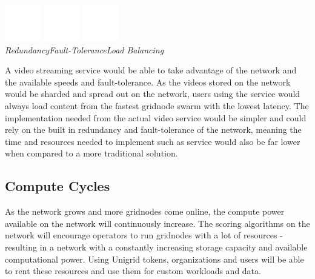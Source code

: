 \documentclass{article}
\begin{document}
\begin{center}
\vspace{0.1cm}
\includegraphics[width=45pt]{redundancy}
\hspace{1.5cm}
\includegraphics[width=45pt]{tolerance}
\hspace{1.5cm}
\includegraphics[width=45pt]{load-balance}
\\
\vspace{0.12cm}
\hspace{8pt}\emph{Redundancy}\hspace{38pt}\emph{Fault-Tolerance}\hspace{30pt}\emph{Load Balancing}
\end{center}

\noindent A video streaming service would be able to take advantage of the network and the available speeds and fault-tolerance. As the videos stored on the network would be sharded and spread out on the network, users using the service would always load content from the fastest gridnode swarm with the lowest latency. The implementation needed from the actual video service would be simpler and could rely on the built in redundancy and fault-tolerance of the network, meaning the time and resources needed to implement such as service would also be far lower when compared to a more traditional solution.

\subsection{Compute Cycles}
As the network grows and more gridnodes come online, the compute power available on the network will continuously increase. The scoring algorithms on the network will encourage operators to run gridnodes with a lot of resources - resulting in a network with a constantly increasing storage capacity and available computational power. Using Unigrid tokens, organizations and users will be able to rent these resources and use them for custom workloads and data.
\end{document}
